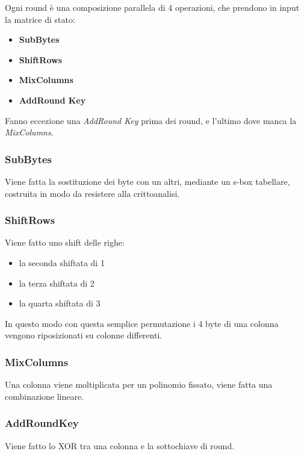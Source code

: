 \noindent Ogni round è una composizione parallela di 4 operazioni, che prendono 
in input la matrice di stato:
\begin{itemize}
    \item \textbf{SubBytes}
    \item \textbf{ShiftRows}
    \item \textbf{MixColumns}
    \item \textbf{AddRound Key}
\end{itemize}

\noindent Fanno eccezione una \textit{AddRound Key} prima dei round, e l'ultimo 
dove manca la \textit{MixColumns}.



\subsubsection{SubBytes}

Viene fatta la sostituzione dei byte con un altri, mediante un s-box tabellare, 
costruita in modo da resistere alla crittoanalisi.

\subsubsection{ShiftRows}

Viene fatto uno shift delle righe:
\begin{itemize}
    \item la seconda shiftata di 1 
    \item la terza shiftata di 2 
    \item la quarta shiftata di 3
\end{itemize}

\noindent In questo modo con questa semplice permutazione i 4 byte di una 
colonna vengono riposizionati su colonne differenti.

\subsubsection{MixColumns}

Una colonna viene moltiplicata per un polinomio fissato, viene fatta una combinazione 
lineare.

\subsubsection{AddRoundKey}

Viene fatto lo XOR tra una colonna e la sottochiave di round.

